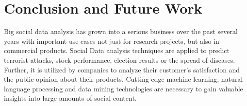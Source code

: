 
\chapter{Conclusion and Future Work}
\label{cha:conclusion-future-work}
Big social data analysis has grown into a serious business over the past several years with important use cases not just for research projects, but also in commercial products. Social Data analysis techniques are applied to predict terrorist attacks, stock performance, election results or the spread of diseases. Further, it is utilized by companies to analyze their customer’s satisfaction and the public opinion about their products. Cutting edge machine learning, natural language processing and data mining technologies are necessary to gain valuable insights into large amounts of social content. 